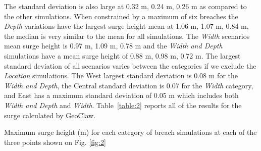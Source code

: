 \documentclass{coastal_paper}
\begin{document}
The standard deviation is also large at 0.32 m, 0.24 m, 0.26 m as compared to the other simulations. When constrained by a maximum of six breaches the \emph{Depth} variations have the largest surge height mean at 1.06 m, 1.07 m, 0.84 m, the median is very similar to the mean for all simulations. The \emph{Width} scenarios mean surge height is 0.97 m, 1.09 m, 0.78 m and the \emph{Width and Depth} simulations have a mean surge height of 0.88 m, 0.98 m, 0.72 m.
 The largest standard deviation of all scenarios varies between the categories if we exclude the \emph{Location} simulations. The West largest standard deviation is 0.08 m for the \emph{Width and Depth}, the Central standard deviation is 0.07 for the \emph{Width} category, and East has a maximum standard deviation of 0.05 m which includes both \emph{Width and Depth} and \emph{Width}. Table~\ref{table:2} reports all of the results for the surge calculated by GeoClaw.
 
\begin{table}[ht]
    \caption{Maximum surge height (m) for each category of breach simulations at each of the three points shown on Fig. \ref{fig:2}}
    \begin{adjustbox}{width=0.9\textwidth} %
    
    \end{adjustbox}
    \label{table:2}
\end{table}
\end{document}
